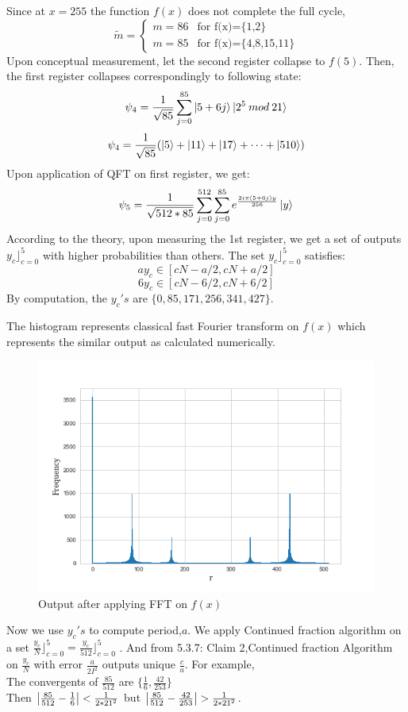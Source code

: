 Since at $x=255$ the function $f(x)$ does not complete the full cycle,
$$ \tilde{m} = \begin {cases}
    m = 86 &\text {for f(x)=\{1,2\}} \\
    m = 85 &\text {for f(x)=\{4,8,15,11\}}
    \end{cases}  $$
Upon conceptual measurement, let the second register collapse to $f(5)$. Then, the first register collapses correspondingly to following state:
$$\psi_4 = \frac{1}{\sqrt{85}} \sum_{j=0}^{85} \ket{5+6j} \ket{2^5 \:mod\: 21} $$
$$\psi_4 = \frac{1}{\sqrt{85}} ( \ket{5} + \ket{11} +\ket{17}+ \dots + \ket{510} )$$
Upon application of QFT on first register, we get:
$$\psi_5 = \frac{1}{\sqrt{512*85}} \sum_{j=0}^{512} \sum_{j=0}^{85} e^{\frac{2i\pi (5+6j)y }{256}} \ket{y} $$
According to the theory, upon measuring the 1st register, we get a set of outputs $y_c\rfloor_{c=0}^{5}$ with higher probabilities than others. The set $y_c\rfloor_{c=0}^{5}$ satisfies:
$$a y_c \in [cN-a/2, cN+a/2]$$
$$6 y_c \in [cN-6/2, cN+6/2]$$
By computation, the $y_c's$ are $\{0,85, 171, 256, 341, 427\}$.

The histogram represents classical fast Fourier transform on $f(x)$ which represents the similar output as calculated numerically.
\begin{figure}[H]
    \centering
    \includegraphics[scale=0.45]{figures/fft_on_2^xmod21.png} 
    \caption{Output after applying \acrshort{FFT} on $f(x)$}
    \label{fig: fft_on_2^xmod21}
\end{figure}
Now we use $y_c's$ to compute period,$a$.
We apply Continued fraction algorithm on a set $\frac{y_c}{N}\rfloor_{c=0}^{5} = \frac{y_c}{512}\rfloor_{c=0}^{5}$ . And from 5.3.7: Claim 2,Continued fraction Algorithm on $\frac{y_c}{N}$ with error $\frac{a}{2I^2}$ outputs unique $\frac{c}{a}$. For example,
\\ The convergents of  $\frac{85}{512}$ are $\{\frac{1}{6}, \frac{42}{253}\}$
\\ Then $\abs{\frac{85}{512} -\frac{1}{6}}<\frac{1}{2*{21}^2}$
but $\abs{\frac{85}{512} -\frac{42}{253}}>\frac{1}{2*{21}^2}$.

